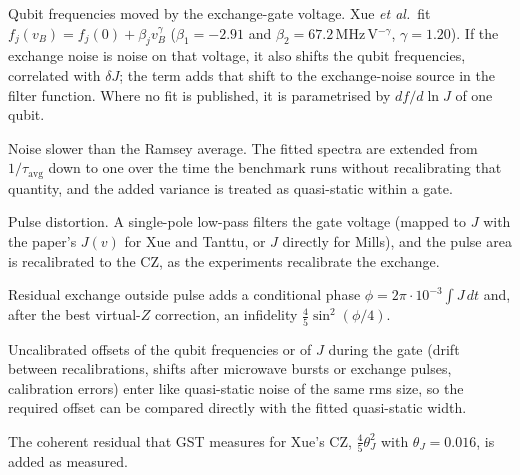 \documentclass[reprint,aps,pra,floatfix,superscriptaddress,longbibliography,nofootinbib]{revtex4-2}
\begin{document}
Qubit frequencies moved by the exchange-gate voltage. Xue \emph{et al.}\ fit $f_j(v_B) = f_j(0) + \beta_j v_B^{\gamma}$ ($\beta_1=-2.91$ and $\beta_2=67.2$\,MHz\,V$^{-\gamma}$, $\gamma=1.20$). If the exchange noise is noise on that voltage, it also shifts the qubit frequencies, correlated with $\delta J$; the term adds that shift to the exchange-noise source in the filter function. Where no fit is published, it is parametrised by $df/d\ln J$ of one qubit.

Noise slower than the Ramsey average. The fitted spectra are extended from $1/\tau_\mathrm{avg}$ down to one over the time the benchmark runs without recalibrating that quantity, and the added variance is treated as quasi-static within a gate.

Pulse distortion. A single-pole low-pass filters the gate voltage (mapped to $J$ with the paper's $J(v)$ for Xue and Tanttu, or $J$ directly for Mills), and the pulse area is recalibrated to the CZ, as the experiments recalibrate the exchange.

Residual exchange outside pulse adds a conditional phase $\phi=2\pi\cdot10^{-3}\int J\,dt$ and, after the best virtual-$Z$ correction, an infidelity $\tfrac{4}{5}\sin^2(\phi/4)$.

Uncalibrated offsets of the qubit frequencies or of $J$ during the gate (drift between recalibrations, shifts after microwave bursts or exchange pulses, calibration errors) enter like quasi-static noise of the same rms size, so the required offset can be compared directly with the fitted quasi-static width.

The coherent residual that GST measures for Xue's CZ, $\tfrac45\theta_J^2$ with $\theta_J=0.016$, is added as measured.
\end{document}
